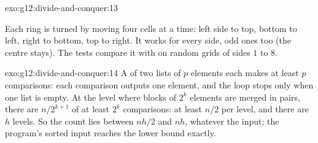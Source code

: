 \begin{solution}{exo:g12:divide-and-conquer:13}
\smallskip\noindent\hspace*{2em}

\noindent\hspace*{4em}

\noindent\hspace*{4em}

\noindent\hspace*{6em}

\noindent\hspace*{6em}

\noindent\hspace*{8em}

\noindent\hspace*{8em}

\noindent\hspace*{8em}

\noindent\hspace*{8em}

\noindent\hspace*{8em}

\smallskip\noindent Each ring is turned by moving four cells at a time: left side to top, bottom to left, right to
bottom, top to right. It works for every side, odd ones too (the centre stays). The tests compare it with
 on random grids of sides $1$ to $8$.
\end{solution}

\begin{solution}{exo:g12:divide-and-conquer:14}
A  of two lists of $p$ elements each makes at least $p$ comparisons: each comparison outputs one element, and
the loop stops only when one list is empty. At the level where blocks of $2^k$ elements are merged in pairs, there are
$n / 2^{k+1}$  of at least $2^k$ comparisons: at least $n/2$ per level, and there are $h$ levels. So the count
lies between $n h / 2$ and $n h$, whatever the input; the program's sorted input reaches the lower bound exactly.
\end{solution}

